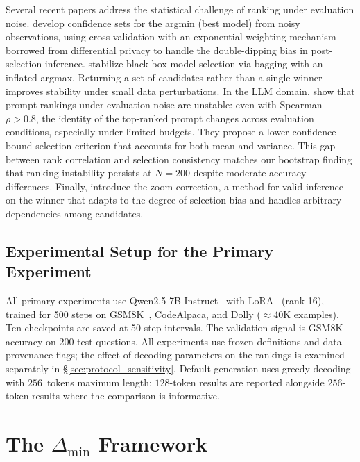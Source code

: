 \documentclass[pdflatex,sn-mathphys-ay,oneside]{sn-jnl}
\theoremstyle{thmstylethree}
\begin{document}
Several recent papers address the statistical challenge of ranking under evaluation noise. \citet{zhang2024winners} develop confidence sets for the argmin (best model) from noisy observations, using cross-validation with an exponential weighting mechanism borrowed from differential privacy to handle the double-dipping bias in post-selection inference. \citet{adrian2024stabilizing} stabilize black-box model selection via bagging with an inflated argmax. Returning a set of candidates rather than a single winner improves stability under small data perturbations. In the LLM domain, \citet{du2026stability} show that prompt rankings under evaluation noise are unstable: even with Spearman $\rho>0.8$, the identity of the top-ranked prompt changes across evaluation conditions, especially under limited budgets. They propose a lower-confidence-bound selection criterion that accounts for both mean and variance. This gap between rank correlation and selection consistency matches our bootstrap finding that ranking instability persists at $N=200$ despite moderate accuracy differences. Finally, \citet{zrnic2024flexible} introduce the zoom correction, a method for valid inference on the winner that adapts to the degree of selection bias and handles arbitrary dependencies among candidates.

\subsection{Experimental Setup for the Primary Experiment}

All primary experiments use Qwen2.5-7B-Instruct~\citep{qwen2024qwen2} with LoRA~\citep{hu2022lora} (rank 16), trained for 500 steps on GSM8K~\citep{cobbe2021gsm8k}, CodeAlpaca, and Dolly ($\approx$40K examples). Ten checkpoints are saved at 50-step intervals. The validation signal is GSM8K accuracy on 200 test questions. All experiments use frozen definitions and data provenance flags; the effect of decoding parameters on the rankings is examined separately in \S\ref{sec:protocol_sensitivity}. Default generation uses greedy decoding with $256$~tokens maximum length; $128$-token results are reported alongside $256$-token results where the comparison is informative.

\section{The $\Delta_{\min}$ Framework}\label{sec:framework}
\end{document}
